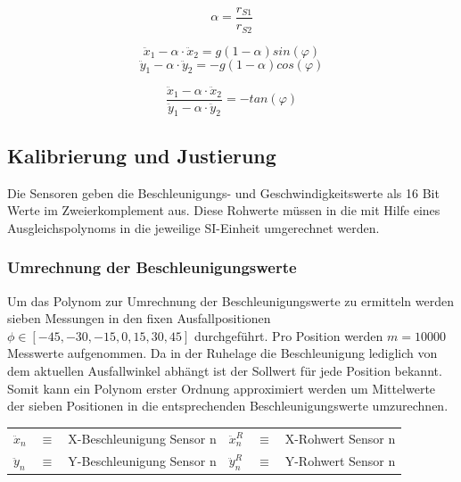 \begin{equation}
\alpha = \frac{r_{S1}}{r_{S2}}
\end{equation}

\begin{equation}
\ddot{x}_1 - \alpha \cdot \ddot{x}_2 = 
g(1 - \alpha)sin(\varphi)
\end{equation}
\begin{equation}
\ddot{y}_1 - \alpha \cdot \ddot{y}_2 = 
-g(1- \alpha)cos(\varphi)
\end{equation}

\begin{equation}
\frac{\ddot{x}_1 - \alpha \cdot \ddot{x}_2}{\ddot{y}_1 - \alpha \cdot \ddot{y}_2} = -tan(\varphi)
\end{equation}

\subsection{Kalibrierung und Justierung}
Die Sensoren geben die Beschleunigungs- und Geschwindigkeitswerte als 16 Bit Werte im Zweierkomplement aus. Diese Rohwerte müssen in die mit Hilfe eines Ausgleichspolynoms in die jeweilige SI-Einheit umgerechnet werden. 

\subsubsection{Umrechnung der Beschleunigungswerte}
Um das Polynom zur Umrechnung der Beschleunigungswerte zu ermitteln werden sieben Messungen in den fixen Ausfallpositionen $\phi \in [-45, -30, -15, 0, 15, 30, 45]$ durchgeführt. Pro Position werden $m = 10000$ Messwerte aufgenommen. Da in der Ruhelage die Beschleunigung lediglich von dem aktuellen Ausfallwinkel abhängt ist der Sollwert für jede Position bekannt. Somit kann ein Polynom erster Ordnung approximiert werden um Mittelwerte der sieben Positionen in die entsprechenden Beschleunigungswerte umzurechnen.

\begin{table}[h]
\centering
\begin{tabular}{lcllcl}
$\ddot{x}_n$ &$\equiv$& X-Beschleunigung Sensor n &
$\ddot{x}^R_n$ &$\equiv$& X-Rohwert Sensor n \\
$\ddot{y}_n$ &$\equiv$& Y-Beschleunigung Sensor n &
$\ddot{y}^R_n$ &$\equiv$& Y-Rohwert Sensor n
\end{tabular}
\end{table}

